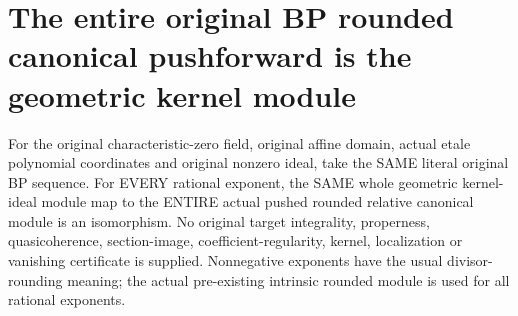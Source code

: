 \section{The entire original BP rounded canonical pushforward is the geometric kernel module}
\label{sec:bp-global-canonical-module}

\begin{theorem}
\label{sc0-bp-global-canonical-module:whole-original-isomorphism}
\leanok
For the original characteristic-zero field, original affine domain,
actual etale polynomial coordinates and original nonzero ideal,
take the SAME literal original BP sequence. For EVERY rational
exponent, the SAME whole geometric kernel-ideal module map to
the ENTIRE actual pushed rounded relative canonical module is
an isomorphism. No original target integrality, properness,
quasicoherence, section-image, coefficient-regularity, kernel,
localization or vanishing certificate is supplied.
Nonnegative exponents have the usual divisor-rounding meaning;
the actual pre-existing intrinsic rounded module is used for all
rational exponents.
\end{theorem}

